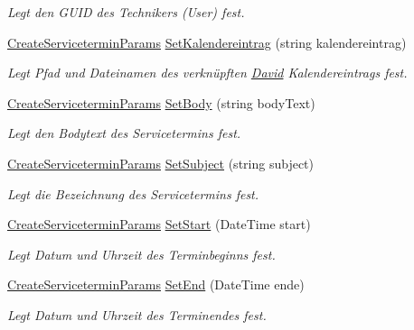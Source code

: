 \begin{DoxyCompactItemize}
\begin{DoxyCompactList}\small\item\em Legt den G\+U\+ID des Technikers (User) fest. \end{DoxyCompactList}\item 
\hyperlink{class_products_1_1_common_1_1_parameters_1_1_create_servicetermin_params}{Create\+Servicetermin\+Params} \hyperlink{class_products_1_1_common_1_1_parameters_1_1_create_servicetermin_params_ad56b4d0b261127caa1d47ab8a4f1540e}{Set\+Kalendereintrag} (string kalendereintrag)
\begin{DoxyCompactList}\small\item\em Legt Pfad und Dateinamen des verknüpften \hyperlink{namespace_david}{David} Kalendereintrags fest. \end{DoxyCompactList}\item 
\hyperlink{class_products_1_1_common_1_1_parameters_1_1_create_servicetermin_params}{Create\+Servicetermin\+Params} \hyperlink{class_products_1_1_common_1_1_parameters_1_1_create_servicetermin_params_aff3457060dddb349f9282f0c2b9a92e5}{Set\+Body} (string body\+Text)
\begin{DoxyCompactList}\small\item\em Legt den Bodytext des Servicetermins fest. \end{DoxyCompactList}\item 
\hyperlink{class_products_1_1_common_1_1_parameters_1_1_create_servicetermin_params}{Create\+Servicetermin\+Params} \hyperlink{class_products_1_1_common_1_1_parameters_1_1_create_servicetermin_params_ab35af04084c75eae1a3b32b82b27c370}{Set\+Subject} (string subject)
\begin{DoxyCompactList}\small\item\em Legt die Bezeichnung des Servicetermins fest. \end{DoxyCompactList}\item 
\hyperlink{class_products_1_1_common_1_1_parameters_1_1_create_servicetermin_params}{Create\+Servicetermin\+Params} \hyperlink{class_products_1_1_common_1_1_parameters_1_1_create_servicetermin_params_af2ce49765cfc161a92d1662e6a5479fe}{Set\+Start} (Date\+Time start)
\begin{DoxyCompactList}\small\item\em Legt Datum und Uhrzeit des Terminbeginns fest. \end{DoxyCompactList}\item 
\hyperlink{class_products_1_1_common_1_1_parameters_1_1_create_servicetermin_params}{Create\+Servicetermin\+Params} \hyperlink{class_products_1_1_common_1_1_parameters_1_1_create_servicetermin_params_a15d9dbc5b78e7b4746e5db794193f4d2}{Set\+End} (Date\+Time ende)
\begin{DoxyCompactList}\small\item\em Legt Datum und Uhrzeit des Terminendes fest. \end{DoxyCompactList}\end{DoxyCompactItemize}
